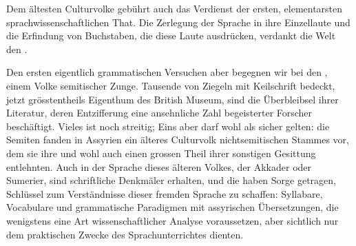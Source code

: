 \label{I.IV.aegypter}
Dem ältesten Culturvolke gebührt auch das Verdienst der ersten, elementarsten sprachwissenschaftlichen That. Die Zerlegung der Sprache in ihre Einzellaute und die Erfindung von Buchstaben, die diese Laute ausdrücken, verdankt die Welt den .

\label{I.IV.assyrer}
Den ersten eigentlich grammatischen Versuchen aber begegnen wir bei den , einem Volke semitischer Zunge. Tausende von Ziegeln mit Keilschrift bedeckt, jetzt grösstentheils Eigenthum des British Museum, sind die Überbleibsel ihrer Literatur, deren Entzifferung eine ansehnliche Zahl begeisterter Forscher beschäftigt. Vieles ist noch streitig; Eins aber darf wohl als sicher gelten: die Semiten fanden in Assyrien ein älteres Culturvolk nichtsemitischen Stammes vor, dem sie ihre  und wohl auch einen grossen Theil ihrer sonstigen Gesittung entlehnten. Auch in der Sprache dieses älteren Volkes, der Akkader oder Sumerier, sind schriftliche Denkmäler erhalten, und die  haben Sorge getragen, Schlüssel zum Verständnisse dieser fremden Sprache zu \label{sp.19} schaffen: Syllabare, Vocabulare und grammatische Paradigmen mit assyrischen Übersetzungen, die wenigstens eine Art wissenschaftlicher Analyse voraussetzen, aber sichtlich nur dem praktischen Zwecke des Sprachunterrichtes dienten.

